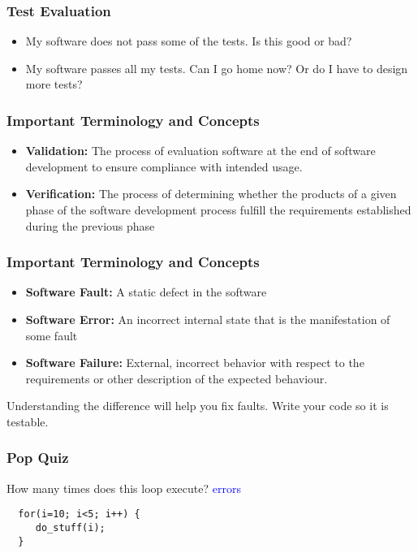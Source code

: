 \documentclass{beamer}
\begin{document}
\begin{frame}
  \frametitle{Test Evaluation}
  \begin{itemize}
  \item My software does not pass some of the tests. Is this good or
    bad?
  \item My software passes all my tests. Can I go home now? Or do I
    have to design more tests?
  \end{itemize}
\end{frame}
\begin{frame}
  \frametitle{Important Terminology and Concepts}

  \begin{itemize}
  \item {\bf Validation:} The process of evaluation software at the end
    of software development to ensure compliance with intended usage.
  \item {\bf Verification:} The process of determining whether the
    products of a given phase of the software development process
    fulfill the requirements established during the previous phase
  \end{itemize}
  
\end{frame}
\begin{frame}
  \frametitle{Important Terminology and Concepts}
  \begin{itemize}
  \item  {\bf Software Fault:} A static defect in the software
  \item {\bf Software Error:} An incorrect internal state that is the
    manifestation of some fault 
  \item {\bf  Software Failure:} External,
    incorrect behavior with respect to the requirements or other
    description of the expected behaviour.
  \end{itemize}
Understanding the difference will help you fix faults. Write your code
so it is testable.
\end{frame}
\begin{frame}[fragile]
  \frametitle{Pop Quiz}
  How many times does this loop execute?
 \textcolor{blue}{errors}\begin{lstlisting}
  for(i=10; i<5; i++) {
     do_stuff(i);
  }
\end{lstlisting}

\end{frame}
\end{document}
